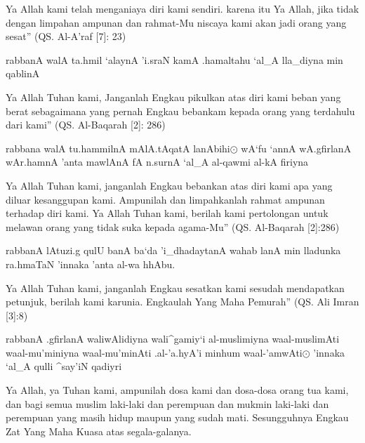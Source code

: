 \documentclass[a4paper,12pt,makeidx]{article}
\begin{document}
\vspace{0.5cm}
Ya Allah kami telah menganiaya diri kami sendiri. karena itu Ya Allah, jika tidak dengan limpahan ampunan dan rahmat-Mu niscaya kami akan jadi orang yang sesat” (QS. Al-A’raf [7]: 23)

\vspace{0.5cm}
\begin{arabtext}
rabbanA walA ta.hmil `alaynA 'i.sraN kamA .hamaltahu `al_A lla_diyna min qablinA
\end{arabtext}

\vspace{0.5cm}
Ya Allah Tuhan kami, Janganlah Engkau pikulkan atas diri kami beban yang berat sebagaimana yang pernah Engkau bebankam kepada orang yang terdahulu dari kami” (QS. Al-Baqarah [2]: 286) 

\vspace{0.5cm}
\begin{arabtext}
rabbana walA tu.hammilnA mAlA.tAqatA lanAbihi$\odot$
wA`fu `annA wA.gfirlanA wAr.hamnA 'anta mawlAnA fA n.surnA `al_A al-qawmi al-kA firiyna
\end{arabtext}

\vspace{0.5cm}
Ya Allah Tuhan kami, janganlah Engkau bebankan atas diri kami apa yang diluar kesanggupan kami. Ampunilah dan limpahkanlah rahmat ampunan terhadap diri kami. Ya Allah Tuhan kami, berilah kami pertolongan untuk melawan orang yang tidak suka kepada agama-Mu” (QS. Al-Baqarah [2]:286) 

\vspace{0.5cm}
\begin{arabtext}
rabbanA lAtuzi.g qulU banA ba`da 'i_dhadaytanA wahab lanA min lladunka ra.hmaTaN 'innaka 'anta al-wa hhAbu.
\end{arabtext}

\vspace{0.5cm}
Ya Allah Tuhan kami, janganlah Engkau sesatkan kami sesudah
mendapatkan petunjuk, berilah kami karunia. Engkaulah Yang 
Maha Pemurah” (QS. Ali Imran [3]:8)

\vspace{0.5cm}
\begin{arabtext}
rabbanA .gfirlanA waliwAlidiyna wali^gamiy`i al-muslimiyna
waal-muslimAti waal-mu'miniyna waal-mu'minAti
.al-'a.hyA'i minhum waal-'amwAti$\odot$
'innaka `al_A qulli ^say'iN qadiyri
\end{arabtext}

\vspace{0.5cm}
Ya Allah, ya Tuhan kami, ampunilah dosa kami dan dosa-dosa 
orang tua kami, dan bagi semua muslim laki-laki dan perempuan 
dan mukmin laki-laki dan perempuan yang masih hidup maupun 
yang sudah mati. Sesungguhnya Engkau Zat Yang Maha Kuasa
atas segala-galanya.
\end{document}
